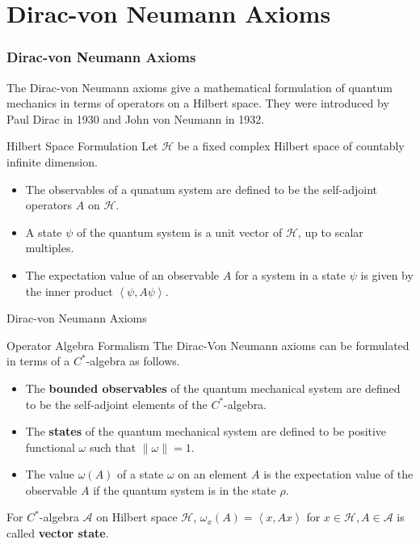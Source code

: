 \documentclass{beamer}
\begin{document}
        \section{Dirac-von Neumann Axioms}
        \begin{frame}
            \frametitle{Dirac-von Neumann Axioms}
            
            The Dirac-von Neumann axioms give a mathematical formulation of quantum mechanics in terms of operators on a Hilbert space. They were introduced by Paul Dirac in 1930 and John von Neumann in 1932.\pause
            
            \begin{block}{Hilbert Space Formulation}
            Let \(\mathcal{H}\) be a fixed complex Hilbert space of countably infinite dimension.\pause
            \begin{itemize}
                \item The observables of a qunatum system are defined to be the self-adjoint operators \(A\) on \(\mathcal{H}\).\pause
                \item A state \(\psi\) of the quantum system is a unit vector of \(\mathcal{H}\), up to scalar multiples.\pause
                \item The expectation value of an observable \(A\) for a system in a state \(\psi\) is given by the inner product \(\left \langle \psi,A\psi \right \rangle\).
            \end{itemize}
        \end{block}
    \end{frame}
    \begin{frame}{Dirac-von Neumann Axioms}
        \begin{block}{Operator Algebra Formalism}
            The Dirac-Von Neumann axioms can be formulated in terms of a \(C^\ast\)-algebra as follows.\pause
            \begin{itemize}
                \item The \textbf{bounded observables} of the quantum mechanical system are defined to be the self-adjoint elements of the \(C^\ast\)-algebra.\pause
                \item The \textbf{states} of the quantum mechanical system are defined to be positive functional \(\omega\) such that \(\left \lVert \omega \right \rVert=1\).\pause
                \item The value \(\omega(A)\) of a state \(\omega\) on an element \(A\) is the expectation value of the observable \(A\) if the quantum system is in the state \(\rho\).\pause
            \end{itemize}
        \end{block}        
        \begin{example}
            For \(C^\ast\)-algebra \(\mathcal{A}\) on Hilbert space \(\mathcal{H}\),
            \(\omega_x(A)=\left \langle x,Ax \right \rangle\) for \(x \in \mathcal{H}, A \in \mathcal{A}\) is called \textbf{vector state}.
        \end{example}
    \end{frame}
    
\end{document}
